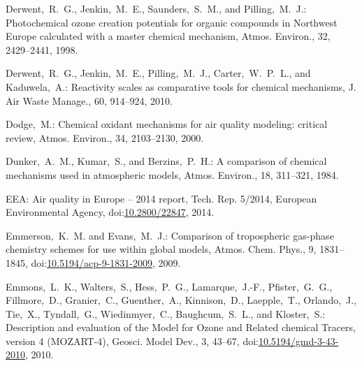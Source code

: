 \documentclass[acpd, online, hvmath]{copernicus}
\begin{document}
\begin{thebibliography}{34}
 Derwent,~R.~G., Jenkin,~M.~E.,
  Saunders,~S.~M., and Pilling,~M.~J.: {Photochemical ozone creation
    potentials for organic compounds in Northwest Europe calculated
    with a master chemical mechanism}, Atmos. Environ., 32,
  2429--2441, 1998.


 Derwent,~R.~G., Jenkin,~M.~E.,
  Pilling,~M.~J., Carter,~W.~P.~L., and Kaduwela,~A.: {Reactivity
    scales as comparative tools for chemical mechanisms}, J. Air
  Waste Manage., 60, 914--924, 2010.


 Dodge,~M.: {Chemical oxidant
    mechanisms for air quality modeling: critical review},
  Atmos. Environ., 34, 2103--2130, 2000.


  Dunker,~A.~M., Kumar,~S., and Berzins,~P.~H.: {A comparison of
    chemical mechanisms used in atmospheric models}, Atmos. Environ.,
  18, 311--321, 1984.


 EEA: {Air quality in Europe -- 2014
    report}, Tech. Rep. 5/2014, European Environmental Agency,
  doi:\href{http://dx.doi.org/10.2800/22847}{10.2800/22847}, 2014. 


  Emmerson,~K.~M. and Evans,~M.~J.: Comparison of tropospheric
  gas-phase chemistry schemes for use within global models,
  Atmos. Chem. Phys., 9, 1831--1845,
doi:\href{http://dx.doi.org/10.5194/acp-9-1831-2009}{10.5194/acp-9-1831-2009},
  2009.



  Emmons,~L.~K., Walters,~S., Hess,~P.~G., Lamarque,~J.-F.,
  Pfister,~G.~G., Fillmore,~D., Granier,~C., Guenther,~A.,
  Kinnison,~D., Laepple,~T., Orlando,~J., Tie,~X., Tyndall,~G.,
  Wiedinmyer,~C., Baughcum,~S.~L., and Kloster,~S.: Description and
  evaluation of the Model for Ozone and Related chemical Tracers,
  version 4 (MOZART-4), Geosci. Model Dev., 3, 43--67,
  doi:\href{http://dx.doi.org/10.5194/gmd-3-43-2010}{10.5194/gmd-3-43-2010}, 2010.




\end{thebibliography}
\end{document}

